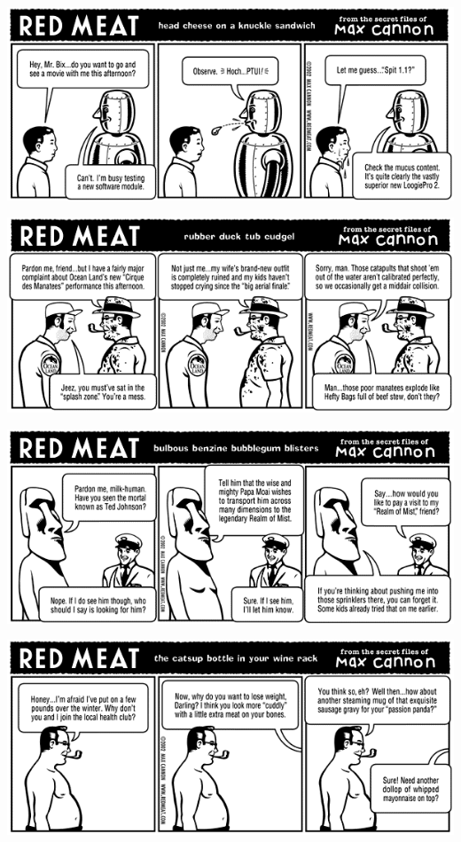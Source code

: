 \documentclass[a4paper,twoside,11pt]{article}
\begin{document}
\includegraphics[width=\textwidth]{redmeat_2002-06-11.png}



\includegraphics[width=\textwidth]{redmeat_2002-06-18.png}



\includegraphics[width=\textwidth]{redmeat_2002-06-25.png}



\includegraphics[width=\textwidth]{redmeat_2002-07-02.png}
\end{document}
